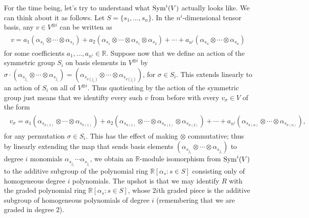 \noindent For the time being, let's try to understand what $\textnormal{Sym}^i(V)$ actually looks like. We can think about it as follows. Let $S = \{s_1, \dots, s_n\}$. In the $n^i$-dimensional tensor basis, any $v \in V^{\otimes i}$ can be written as
\begin{align*}
\begin{split}
v = a_1(\alpha_{s_1} \otimes \cdots \otimes \alpha_{s_1}) + a_2(\alpha_{s_1} \otimes \cdots \otimes \alpha_{s_1} \otimes \alpha_{s_2}) + \cdots + a_{n^i}(\alpha_{s_n} \otimes \cdots \otimes \alpha_{s_n})
\end{split}
\end{align*}
\noindent for some coefficients $a_1, \dots, a_{n^i} \in \mathbb{R}$. Suppose now that we define an action of the symmetric group $S_i$ on basis elements in $V^{\otimes i}$ by $\sigma \cdot (\alpha_{s_{j_1}} \otimes \cdots \otimes \alpha_{s_{j_i}}) = (\alpha_{s_{\sigma(j_1)}} \otimes \cdots \otimes \alpha_{s_{\sigma(j_i)}})$, for $\sigma \in S_i$. This extends linearly to an action of $S_i$ on all of $V^{\otimes i}$. Thus quotienting by the action of the symmetric group just means that we identifty every such $v$ from before with every $v_\sigma \in V$ of the form
\begin{align*}
\begin{split}
v_\sigma = a_1(\alpha_{s_{\sigma(1)}} \otimes \cdots \otimes \alpha_{s_{\sigma(1)}}) + a_2(\alpha_{s_{\sigma(1)}} \otimes \cdots \otimes \alpha_{s_{\sigma(1)}} \otimes \alpha_{s_{\sigma(2)}}) + \cdots + a_{n^i}(\alpha_{s_{\sigma(n)}} \otimes \cdots \otimes \alpha_{s_{\sigma(n)}}),
\end{split}
\end{align*}
for any permutation $\sigma \in S_i$. This has the effect of making $\otimes$ commutative; thus by linearly extending the map that sends basis elements $(\alpha_{s_{j_1}} \otimes \cdots \otimes \alpha_{s_{j_i}})$ to degree $i$ monomials $\alpha_{s_{j_1}} \cdots \alpha_{s_{j_i}}$, we obtain an $\mathbb{R}$-module isomorphism from $\textnormal{Sym}^i(V)$ to the additive subgroup of the polynomial ring $\mathbb{R}[\alpha_s : s \in S]$ consisting only of homogeneous degree $i$ polynomials. The upshot is that we may identify $R$ with the graded polynomial ring $\mathbb{R}[\alpha_s : s \in S]$, whose $2i$th graded piece is the additive subgroup of homogeneous polynomials of degree $i$ (remembering that we are graded in degree $2$).\newpage

